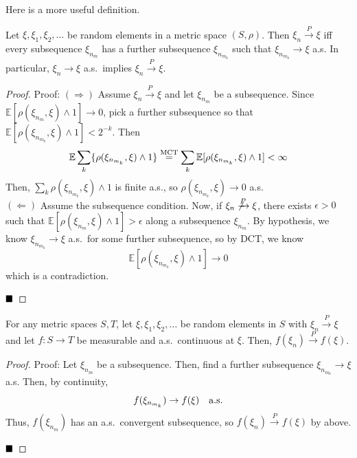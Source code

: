 Here is a more useful definition.

\begin{theorem}
    Let $\xi, \xi_1, \xi_2, \ldots$ be random elements in a metric space $(S, \rho)$. Then $\xi_n \xrightarrow{P} \xi$ iff every subsequence $\xi_{n_m}$ has a further subsequence $\xi_{n_{m_k}}$ such that $\xi_{n_{m_k}} \to \xi$ a.s. In particular, $\xi_n \to \xi$ a.s.\ implies $\xi_n \xrightarrow{P} \xi$.
\end{theorem}
\begin{proof}{Proof:}
    $(\Rightarrow)$ Assume $\xi_n \xrightarrow{P} \xi$ and let $\xi_{n_m}$ be a subsequence. Since $\mathbb{E}[\rho(\xi_{n_m}, \xi) \wedge 1] \to 0$, pick a further subsequence so that $\mathbb{E}[\rho(\xi_{n_{m_k}}, \xi) \wedge 1] < 2^{-k}$. Then
    \[ \mathbb{E}\sum_{k}\{\rho(\xi_{n_{m_k}}, \xi) \wedge 1\} \overset{\tt{MCT}}{=} \sum_{k} \mathbb{E}[\rho(\xi_{n_{m_k}}, \xi) \wedge 1] < \infty \]
    Then, $\sum_{k} \rho(\xi_{n_{m_k}}, \xi) \wedge 1$ is finite a.s., so $\rho(\xi_{n_{m_k}}, \xi) \to 0$ a.s.\\

    $(\Leftarrow)$ Assume the subsequence condition. Now, if $\xi_n \not\xrightarrow{P} \xi$, there exists $\epsilon > 0$ such that $\mathbb{E}[\rho(\xi_{n_m}, \xi) \wedge 1] > \epsilon$ along a subsequence $\xi_{n_m}$. By hypothesis, we know $\xi_{n_{m_k}} \to \xi$ a.s.\ for some further subsequence, so by DCT, we know
    \[ \mathbb{E}[\rho(\xi_{n_{m_k}}, \xi) \wedge 1] \to 0 \]
    which is a contradiction.

    $\qed$
\end{proof}

\begin{lemma}
    For any metric spaces $S, T$, let $\xi, \xi_1, \xi_2, \ldots$ be random elements in $S$ with $\xi_n \xrightarrow{P} \xi$ and let $f : S \to T$ be measurable and a.s.\ continuous at $\xi$. Then, $f(\xi_n) \xrightarrow{P} f(\xi)$.
\end{lemma}
\begin{proof}{Proof:}
    Let $\xi_{n_m}$ be a subsequence. Then, find a further subsequence $\xi_{n_{m_k}} \to \xi$ a.s. Then, by continuity,
    \[ f(\xi_{n_{m_k}}) \to f(\xi) \quad \tt{a.s.} \]
    Thus, $f(\xi_{n_m})$ has an a.s.\ convergent subsequence, so $f(\xi_n) \xrightarrow{P} f(\xi)$ by above.

    $\qed$
\end{proof}

